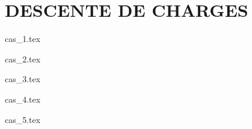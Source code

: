 
    \newpage
    \chapter{DESCENTE DE CHARGES}
    

    {cas_1.tex}

    \newpage
    

    {cas_2.tex}

    \newpage
    

    {cas_3.tex}

    \newpage
    

    {cas_4.tex}

    \newpage
    

    {cas_5.tex}

    \newpage
    